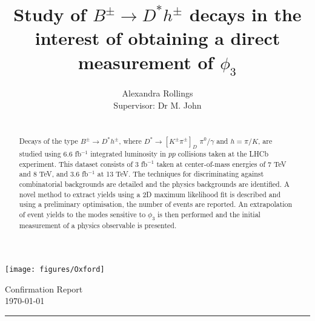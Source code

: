 \documentclass[oneside,12pt]{article}
\title{ \LARGE \textbf{Study of $B^{\pm} \rightarrow D^{*}h^{\pm}$ decays in the
interest of obtaining a direct measurement of $\phi_3$} \\ }
\author{
  Alexandra Rollings\\	
  Supervisor: Dr M. John\\	
}
\makeatletter
\newcommand{\HRule}[1]{\rule{\linewidth}{#1}}     %
\def\printtitle{%
{\centering \@title\par}}
\def\printauthor{%
{\centering \large \@author}}
\makeatother
\begin{document}
\begin{titlepage}
  \begin{nolinenumbers}
    \thispagestyle{empty} 

    \begin{minipage}[c]{.15\linewidth}
      \texttt{[image: figures/Oxford]}
    \end{minipage}\hfill
    \begin{minipage}[c]{.75\linewidth}
      \begin{flushright}
        \normalsize {Confirmation Report} 	%
        \\ \normalsize \today			%
      \end{flushright}
    \end{minipage}



    \HRule{0.5pt} \\						%
    [2.0cm]
    \printtitle 
    \vspace{75pt}
    \printauthor
    \vfill
    \begin{abstract}
      \noindent
      \\
      Decays of the type $B^{\pm} \rightarrow D^{*}h^{\pm}$, where $D^{*} \rightarrow
      [K^{\pm}\pi^{\pm}]_D$ $\pi^{0}\text{/}\gamma$ and $h=\pi/K$, are studied using
      6.6 fb$^{-1}$ integrated luminosity in $pp$ collisions taken at the LHCb
      experiment. This dataset consists of 3 fb${^{-1}}$ taken at center-of-mass
      energies of 7 TeV and 8 TeV, and 3.6 fb${^{-1}}$ at 13 TeV. The techniques for
      discriminating against combinatorial backgrounds are detailed and the physics
      backgrounds are identified. A novel method to extract yields using a 2D maximum
      likelihood fit is described and using a preliminary optimisation, the number of
      events are reported. An extrapolation of event yields to the modes sensitive to
      $\phi_3$ is then performed and the initial measurement of a physics observable
      is presented.
    \end{abstract}
    \vfill
  \end{nolinenumbers}
\end{titlepage}
\setcounter{page}{1}
\end{document}
